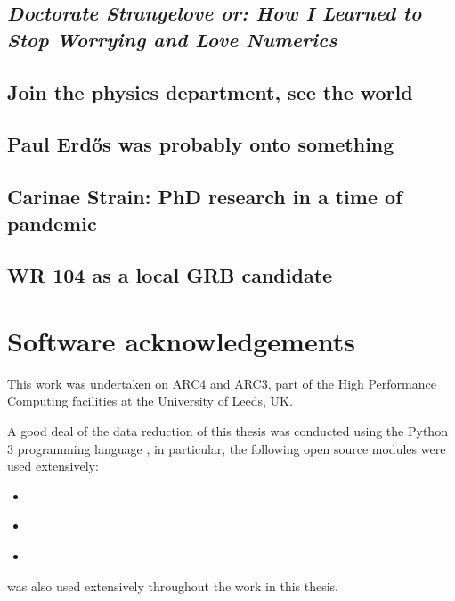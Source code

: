\subsection[\textit{How I Learned to Stop Worrying and Love Numerics}]{\textit{Doctorate Strangelove or: How I Learned to Stop Worrying and Love Numerics}} 

\subsection{Join the physics department, see the world}

\subsection{Paul Erd\H{o}s was probably onto something}

\subsection{Carinae Strain: PhD research in a time of pandemic}

\subsection{WR 104 as a local GRB candidate}

\section{Software acknowledgements}

This work was undertaken on ARC4 and ARC3, part of the High Performance Computing facilities at the University of Leeds, UK.

A good deal of the data reduction of this thesis was conducted using the Python 3 programming language \parencite{10.5555/1593511}, in particular, the following open source modules were used extensively:

\begin{itemize}
  \item {} \parencite{harris2020array}
  \item {} \parencite{astropy:2013,astropy:2018}
  \item {} \parencite{Hunter:2007}
\end{itemize}

\athena{} \parencite{athena} was also used extensively throughout the work in this thesis.

